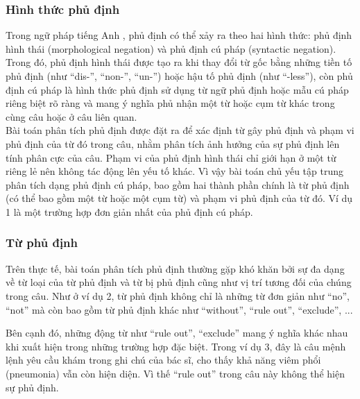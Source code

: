 \subsubsection*{Hình thức phủ định}

Trong ngữ pháp tiếng Anh \cite{Givon1993}, phủ định có thể xảy ra theo hai hình thức: phủ định hình thái (morphological negation) và phủ định cú pháp (syntactic negation). Trong đó, phủ định hình thái được tạo ra khi thay đổi từ gốc bằng những tiền tố phủ định (như ``dis-'', ``non-'', ``un-'') hoặc hậu tố phủ định (như ``-less''), còn phủ định cú pháp là hình thức phủ định sử dụng từ ngữ phủ định hoặc mẫu cú pháp riêng biệt rõ ràng và mang ý nghĩa phủ nhận một từ hoặc cụm từ khác trong cùng câu hoặc ở câu liên quan.\\

Bài toán phân tích phủ định được đặt ra để xác định từ gây phủ định và phạm vi phủ định của từ đó trong câu, nhằm phân tích ảnh hưởng của sự phủ định lên tính phân cực của câu. Phạm vi của phủ định hình thái chỉ giới hạn ở một từ riêng lẻ nên không tác động lên yếu tố khác. Vì vậy bài toán chủ yếu tập trung phân tích dạng phủ định cú pháp, bao gồm hai thành phần chính là từ phủ định (có thể bao gồm một từ hoặc một cụm từ) và phạm vi phủ định của từ đó. Ví dụ 1 là một trường hợp đơn giản nhất của phủ định cú pháp.

\subsubsection*{Từ phủ định}

Trên thực tế, bài toán phân tích phủ định thường gặp khó khăn bởi sự đa dạng về từ loại của từ phủ định và từ bị phủ định cũng như vị trí tương đối của chúng trong câu. Như ở ví dụ 2, từ phủ định không chỉ là những từ đơn giản như ``no'', ``not'' mà còn bao gồm từ phủ định khác như ``without'', ``rule out'', ``exclude'', ... 


Bên cạnh đó, những động từ như ``rule out'', ``exclude'' mang ý nghĩa khác nhau khi xuất hiện trong những trường hợp đặc biệt. Trong ví dụ 3, đây là câu mệnh lệnh yêu cầu khám trong ghi chú của bác sĩ, cho thấy khả năng viêm phổi (pneumonia) vẫn còn hiện diện. Vì thế ``rule out'' trong câu này không thể hiện sự phủ định.

